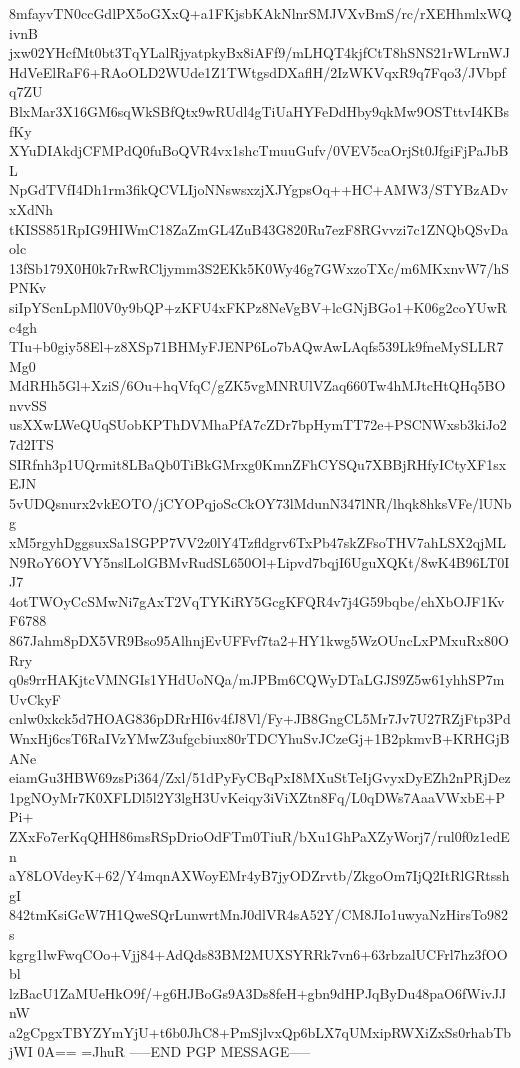 8mfayvTN0ccGdlPX5oGXxQ+a1FKjsbKAkNlnrSMJVXvBmS/rc/rXEHhmlxWQivnB
jxw02YHcfMt0bt3TqYLalRjyatpkyBx8iAFf9/mLHQT4kjfCtT8hSNS21rWLrnWJ
HdVeElRaF6+RAoOLD2WUde1Z1TWtgsdDXaflH/2IzWKVqxR9q7Fqo3/JVbpfq7ZU
BlxMar3X16GM6sqWkSBfQtx9wRUdl4gTiUaHYFeDdHby9qkMw9OSTttvI4KBsfKy
XYuDIAkdjCFMPdQ0fuBoQVR4vx1shcTmuuGufv/0VEV5caOrjSt0JfgiFjPaJbBL
NpGdTVfI4Dh1rm3fikQCVLIjoNNswsxzjXJYgpsOq++HC+AMW3/STYBzADvxXdNh
tKISS851RpIG9HIWmC18ZaZmGL4ZuB43G820Ru7ezF8RGvvzi7c1ZNQbQSvDaolc
13fSb179X0H0k7rRwRCljymm3S2EKk5K0Wy46g7GWxzoTXc/m6MKxnvW7/hSPNKv
siIpYScnLpMl0V0y9bQP+zKFU4xFKPz8NeVgBV+lcGNjBGo1+K06g2coYUwRc4gh
TIu+b0giy58El+z8XSp71BHMyFJENP6Lo7bAQwAwLAqfs539Lk9fneMySLLR7Mg0
MdRHh5Gl+XziS/6Ou+hqVfqC/gZK5vgMNRUlVZaq660Tw4hMJtcHtQHq5BOnvvSS
usXXwLWeQUqSUobKPThDVMhaPfA7cZDr7bpHymTT72e+PSCNWxsb3kiJo27d2ITS
SIRfnh3p1UQrmit8LBaQb0TiBkGMrxg0KmnZFhCYSQu7XBBjRHfyICtyXF1sxEJN
5vUDQsnurx2vkEOTO/jCYOPqjoScCkOY73lMdunN347lNR/lhqk8hksVFe/lUNbg
xM5rgyhDggsuxSa1SGPP7VV2z0lY4Tzfldgrv6TxPb47skZFsoTHV7ahLSX2qjML
N9RoY6OYVY5nslLolGBMvRudSL650Ol+Lipvd7bqjI6UguXQKt/8wK4B96LT0IJ7
4otTWOyCcSMwNi7gAxT2VqTYKiRY5GcgKFQR4v7j4G59bqbe/ehXbOJF1KvF6788
867Jahm8pDX5VR9Bso95AlhnjEvUFFvf7ta2+HY1kwg5WzOUncLxPMxuRx80ORry
q0s9rrHAKjtcVMNGIs1YHdUoNQa/mJPBm6CQWyDTaLGJS9Z5w61yhhSP7mUvCkyF
cnlw0xkck5d7HOAG836pDRrHI6v4fJ8Vl/Fy+JB8GngCL5Mr7Jv7U27RZjFtp3Pd
WnxHj6csT6RaIVzYMwZ3ufgcbiux80rTDCYhuSvJCzeGj+1B2pkmvB+KRHGjBANe
eiamGu3HBW69zsPi364/Zxl/51dPyFyCBqPxI8MXuStTeIjGvyxDyEZh2nPRjDez
1pgNOyMr7K0XFLDl5l2Y3lgH3UvKeiqy3iViXZtn8Fq/L0qDWs7AaaVWxbE+PPi+
ZXxFo7erKqQHH86msRSpDrioOdFTm0TiuR/bXu1GhPaXZyWorj7/rul0f0z1edEn
aY8LOVdeyK+62/Y4mqnAXWoyEMr4yB7jyODZrvtb/ZkgoOm7IjQ2ItRlGRtsshgI
842tmKsiGcW7H1QweSQrLunwrtMnJ0dlVR4sA52Y/CM8JIo1uwyaNzHirsTo982s
kgrg1lwFwqCOo+Vjj84+AdQds83BM2MUXSYRRk7vn6+63rbzalUCFrl7hz3fOObl
lzBacU1ZaMUeHkO9f/+g6HJBoGs9A3Ds8feH+gbn9dHPJqByDu48paO6fWivJJnW
a2gCpgxTBYZYmYjU+t6b0JhC8+PmSjlvxQp6bLX7qUMxipRWXiZxSs0rhabTbjWI
0A==
=JhuR
-----END PGP MESSAGE-----
